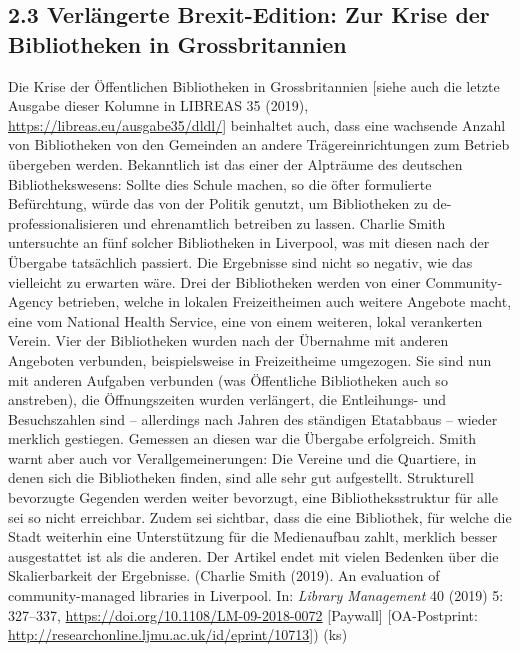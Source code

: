 \documentclass[a4paper,
fontsize=11pt,
oneside,
numbers=noperiodatend,
parskip=half-,
bibliography=totoc,
final
]{scrartcl}
\begin{document}
\hypertarget{verluxe4ngerte-brexit-edition-zur-krise-der-bibliotheken-in-grossbritannien}{%
\subsection{2.3 Verlängerte Brexit-Edition: Zur Krise der Bibliotheken in
Grossbritannien}\label{verluxe4ngerte-brexit-edition-zur-krise-der-bibliotheken-in-grossbritannien}}

Die Krise der Öffentlichen Bibliotheken in Grossbritannien {[}siehe auch
die letzte Ausgabe dieser Kolumne in LIBREAS 35 (2019),
\url{https://libreas.eu/ausgabe35/dldl/}{]} beinhaltet auch, dass eine
wachsende Anzahl von Bibliotheken von den Gemeinden an andere
Trägereinrichtungen zum Betrieb übergeben werden. Bekanntlich ist das
einer der Alpträume des deutschen Bibliothekswesens: Sollte dies Schule
machen, so die öfter formulierte Befürchtung, würde das von der Politik
genutzt, um Bibliotheken zu de-professionalisieren und ehrenamtlich
betreiben zu lassen. Charlie Smith untersuchte an fünf solcher
Bibliotheken in Liverpool, was mit diesen nach der Übergabe tatsächlich
passiert. Die Ergebnisse sind nicht so negativ, wie das vielleicht zu
erwarten wäre. Drei der Bibliotheken werden von einer Community-Agency
betrieben, welche in lokalen Freizeitheimen auch weitere Angebote macht,
eine vom National Health Service, eine von einem weiteren, lokal
verankerten Verein. Vier der Bibliotheken wurden nach der Übernahme mit
anderen Angeboten verbunden, beispielsweise in Freizeitheime umgezogen.
Sie sind nun mit anderen Aufgaben verbunden (was Öffentliche
Bibliotheken auch so anstreben), die Öffnungszeiten wurden verlängert,
die Entleihungs- und Besuchszahlen sind -- allerdings nach Jahren des
ständigen Etatabbaus -- wieder merklich gestiegen. Gemessen an diesen
war die Übergabe erfolgreich. Smith warnt aber auch vor
Verallgemeinerungen: Die Vereine und die Quartiere, in denen sich die
Bibliotheken finden, sind alle sehr gut aufgestellt. Strukturell
bevorzugte Gegenden werden weiter bevorzugt, eine Bibliotheksstruktur
für alle sei so nicht erreichbar. Zudem sei sichtbar, dass die eine
Bibliothek, für welche die Stadt weiterhin eine Unterstützung für die
Medienaufbau zahlt, merklich besser ausgestattet ist als die anderen.
Der Artikel endet mit vielen Bedenken über die Skalierbarkeit der
Ergebnisse. (Charlie Smith (2019). An evaluation of community-managed
libraries in Liverpool. In: \emph{Library Management} 40 (2019) 5:
327--337, \url{https://doi.org/10.1108/LM-09-2018-0072} {[}Paywall{]}
{[}OA-Postprint:
\url{http://researchonline.ljmu.ac.uk/id/eprint/10713}{]}) (ks)
\end{document}
